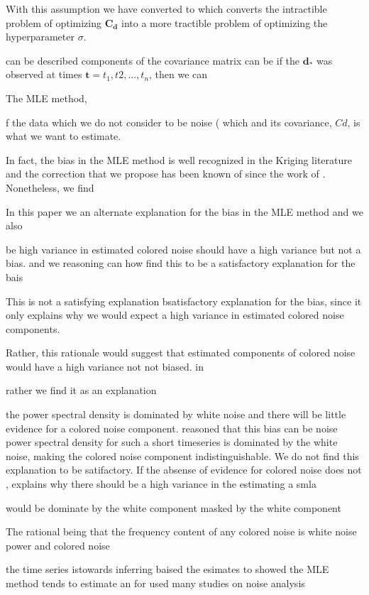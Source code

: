 \documentclass[10pt,a4paper]{article}
\begin{document}
With this assumption we have converted to 
which converts the intractible problem of optimizing $\mathbf{C_d}$ into a more tractible problem of optimizing the hyperparameter $\sigma$. 

can be described  components of the covariance matrix can be   if the $\mathbf{d_*}$ was observed at times $\mathbf{t} = {t_1,t2,...,t_n}$, then we can      

The MLE method, 

  f the data which we do not consider to be noise ( which     and its covariance, $Cd$, is what we want to estimate.  

In fact, the bias in the MLE method is well recognized in the Kriging literature \citep[e.g][]{Cressie1992} and the correction that we propose has been known of since the work of \citet{Patterson1971}. Nonetheless, we find         

In this paper we an alternate explanation for the bias in the MLE method and we also     

be high variance in estimated colored noise should have a high variance but not a bias.   and we reasoning can how find this to be a satisfactory explanation for the bais

This is not a satisfying explanation bsatisfactory explanation for the bias, since it only explains why we would expect a high variance in estimated colored noise components.

Rather, this rationale would suggest that estimated components of colored noise would have a high variance not not biased. in 

rather we find it as an explanation    

the power spectral density is dominated by white noise and there will be little evidence for a colored noise component.   \citet{Langbein2012} reasoned that this bias can be noise power spectral density for such a short timeseries is dominated by the white noise, making the colored noise component indistinguishable.  We do not find this explanation to be satifactory. If the absense of evidence for colored noise does not ,  explains why there should be a high variance in the  estimating a smla   

   

would be dominate by the white component  masked by the white component   

The rational being that the frequency content of any colored noise is    white noise power and colored noise 

the time series istowards inferring  baised  the esimates to  showed the MLE method tends to estimate an     
 for used many studies on noise analysis    
\end{document}
